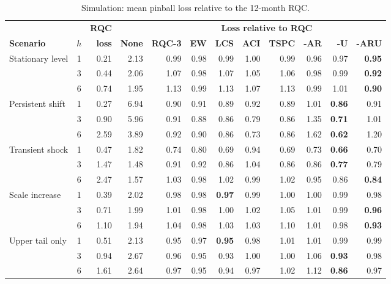 \begin{table}[t]
\caption{Simulation: mean pinball loss relative to the 12-month RQC.\label{tab:sim}}
\centering\footnotesize\setlength{\tabcolsep}{3pt}
\begin{tabular*}{\textwidth}{@{\extracolsep\fill}lc rr rrrrrrrr@{}}
\toprule
 & & \textbf{RQC} & & \multicolumn{8}{c}{\textbf{Loss relative to RQC}} \\
\cmidrule(l){5-12}
\textbf{Scenario} & $h$ & \textbf{loss} & \textbf{None} & \textbf{RQC-3} & \textbf{EW} & \textbf{LCS} & \textbf{ACI} & \textbf{TSPC} & \textbf{-AR} & \textbf{-U} & \textbf{-ARU} \\
\midrule
Stationary level & 1 & 0.21 & 2.13 & 0.99 & 0.98 & 0.99 & 1.00 & 0.99 & 0.96 & 0.97 & \textbf{0.95} \\
 & 3 & 0.44 & 2.06 & 1.07 & 0.98 & 1.07 & 1.05 & 1.06 & 0.98 & 0.99 & \textbf{0.92} \\
 & 6 & 0.74 & 1.95 & 1.13 & 0.99 & 1.13 & 1.07 & 1.13 & 0.99 & 1.01 & \textbf{0.90} \\
\addlinespace
Persistent shift & 1 & 0.27 & 6.94 & 0.90 & 0.91 & 0.89 & 0.92 & 0.89 & 1.01 & \textbf{0.86} & 0.91 \\
 & 3 & 0.90 & 5.96 & 0.91 & 0.88 & 0.86 & 0.79 & 0.86 & 1.35 & \textbf{0.71} & 1.01 \\
 & 6 & 2.59 & 3.89 & 0.92 & 0.90 & 0.86 & 0.73 & 0.86 & 1.62 & \textbf{0.62} & 1.20 \\
\addlinespace
Transient shock & 1 & 0.47 & 1.82 & 0.74 & 0.80 & 0.69 & 0.94 & 0.69 & 0.73 & \textbf{0.66} & 0.70 \\
 & 3 & 1.47 & 1.48 & 0.91 & 0.92 & 0.86 & 1.04 & 0.86 & 0.86 & \textbf{0.77} & 0.79 \\
 & 6 & 2.47 & 1.57 & 1.03 & 0.98 & 1.02 & 0.99 & 1.02 & 0.95 & 0.86 & \textbf{0.84} \\
\addlinespace
Scale increase & 1 & 0.39 & 2.02 & 0.98 & 0.98 & \textbf{0.97} & 0.99 & 1.00 & 1.00 & 0.99 & 0.98 \\
 & 3 & 0.71 & 1.99 & 1.01 & 0.98 & 1.00 & 1.02 & 1.05 & 1.01 & 0.99 & \textbf{0.96} \\
 & 6 & 1.10 & 1.94 & 1.04 & 0.98 & 1.03 & 1.03 & 1.10 & 1.01 & 0.98 & \textbf{0.93} \\
\addlinespace
Upper tail only & 1 & 0.51 & 2.13 & 0.95 & 0.97 & \textbf{0.95} & 0.98 & 1.01 & 1.01 & 0.99 & 0.99 \\
 & 3 & 0.94 & 2.67 & 0.96 & 0.95 & 0.93 & 1.00 & 1.00 & 1.06 & \textbf{0.93} & 0.98 \\
 & 6 & 1.61 & 2.64 & 0.97 & 0.95 & 0.94 & 0.97 & 1.02 & 1.12 & \textbf{0.86} & 0.97 \\

\end{tabular*}
\end{table}

